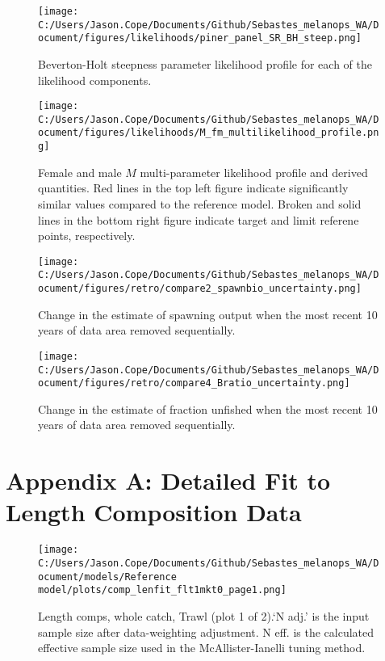 \documentclass[11pt,
  english,
  letterpaper,
]{article}
\begin{document}
\begin{figure}
\centering
\texttt{[image: C:/Users/Jason.Cope/Documents/Github/Sebastes\_melanops\_WA/Document/figures/likelihoods/piner\_panel\_SR\_BH\_steep.png]}
\caption{Beverton-Holt steepness parameter likelihood profile for each of the likelihood components.\label{fig:steepness-profile-components}}
\end{figure}

\begin{figure}
\centering
\texttt{[image: C:/Users/Jason.Cope/Documents/Github/Sebastes\_melanops\_WA/Document/figures/likelihoods/M\_fm\_multilikelihood\_profile.png]}
\caption{Female and male \(M\) multi-parameter likelihood profile and derived quantities. Red lines in the top left figure indicate significantly similar values compared to the reference model. Broken and solid lines in the bottom right figure indicate target and limit referene points, respectively.\label{fig:M-multiprofile-combo}}
\end{figure}

\begin{figure}
\centering
\texttt{[image: C:/Users/Jason.Cope/Documents/Github/Sebastes\_melanops\_WA/Document/figures/retro/compare2\_spawnbio\_uncertainty.png]}
\caption{Change in the estimate of spawning output when the most recent 10 years of data area removed sequentially.\label{fig:retro-ssb}}
\end{figure}

\begin{figure}
\centering
\texttt{[image: C:/Users/Jason.Cope/Documents/Github/Sebastes\_melanops\_WA/Document/figures/retro/compare4\_Bratio\_uncertainty.png]}
\caption{Change in the estimate of fraction unfished when the most recent 10 years of data area removed sequentially.\label{fig:retro-depl}}
\end{figure}

\newpage

\clearpage

\hypertarget{app-a}{%
\section{Appendix A: Detailed Fit to Length Composition Data}\label{app-a}}

\begin{figure}
\centering
\texttt{[image: C:/Users/Jason.Cope/Documents/Github/Sebastes\_melanops\_WA/Document/models/Reference model/plots/comp\_lenfit\_flt1mkt0\_page1.png]}
\caption{Length comps, whole catch, Trawl (plot 1 of 2).`N adj.' is the input sample size after data-weighting adjustment. N eff. is the calculated effective sample size used in the McAllister-Ianelli tuning method.\label{fig:comp_lenfit_flt1mkt0_page1}}
\end{figure}
\end{document}
